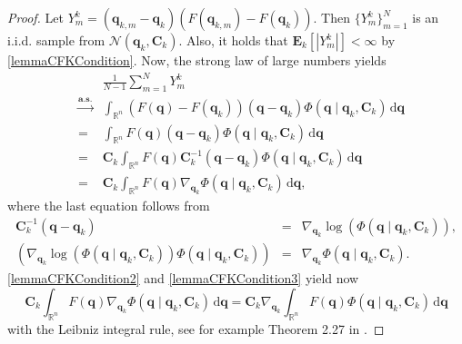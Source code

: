 \begin{proof}
Let $Y^k_m=(\mathbf{q}_{k,m}-\mathbf{q}_k)(F(\mathbf{q}_{k,m})-F(\mathbf{q}_k))$. Then $\{Y^k_m\}_{m=1}^N$ is an i.i.d. sample from $\mathcal{N}(\mathbf{q}_k, \mathbf{C}_k)$. Also, it holds that $\mathbf{E}_k[|Y^k_m|]<\infty$ by \eqref{lemmaCFKCondition}. Now, the strong law of large numbers yields
\begin{eqnarray*}
&&\frac{1}{N-1}\sum_{m=1}^NY^k_m\\
&\xrightarrow{\mathbf{a.s.}}&\int_{\mathbb{R}^n}(F(\mathbf{q})-F(\mathbf{q}_k))(\mathbf{q}-\mathbf{q}_k)\Phi(\mathbf{q}\mid \mathbf{q}_k, \mathbf{C}_k)\,\mathrm{d}\mathbf{q}\\
&=&\int_{\mathbb{R}^n}F(\mathbf{q})(\mathbf{q}-\mathbf{q}_k)\Phi(\mathbf{q}\mid \mathbf{q}_k, \mathbf{C}_k)\,\mathrm{d}\mathbf{q}\\
&=&\mathbf{C}_k\int_{\mathbb{R}^n}F(\mathbf{q})\mathbf{C}^{-1}_k(\mathbf{q}-\mathbf{q}_k)\Phi(\mathbf{q}\mid \mathbf{q}_k, \mathbf{C}_k)\,\mathrm{d}\mathbf{q}\\
&=&\mathbf{C}_k\int_{\mathbb{R}^n}F(\mathbf{q})\nabla_{\mathbf{q}_k}\Phi(\mathbf{q}\mid \mathbf{q}_k, \mathbf{C}_k)\,\mathrm{d}\mathbf{q},
\end{eqnarray*}
where the last equation follows from
\begin{eqnarray*}
\mathbf{C}^{-1}_k(\mathbf{q}-\mathbf{q}_k)&=&\nabla_{\mathbf{q}_k}\log(\Phi(\mathbf{q}\mid \mathbf{q}_k, \mathbf{C}_k)),\\
\left(\nabla_{\mathbf{q}_k}\log(\Phi(\mathbf{q}\mid \mathbf{q}_k, \mathbf{C}_k))\Phi(\mathbf{q}\mid \mathbf{q}_k, \mathbf{C}_k)\right)&=&\nabla_{\mathbf{q}_k}\Phi(\mathbf{q}\mid \mathbf{q}_k, \mathbf{C}_k).
\end{eqnarray*}
\eqref{lemmaCFKCondition2} and \eqref{lemmaCFKCondition3} yield now
\begin{equation*}
\mathbf{C}_k\int_{\mathbb{R}^n}F(\mathbf{q})\nabla_{\mathbf{q}_k}\Phi(\mathbf{q}\mid \mathbf{q}_k, \mathbf{C}_k)\,\mathrm{d}\mathbf{q}=\mathbf{C}_k\nabla_{\mathbf{q}_k}\int_{\mathbb{R}^n}F(\mathbf{q})\Phi(\mathbf{q}\mid \mathbf{q}_k, \mathbf{C}_k)\,\mathrm{d}\mathbf{q}
\end{equation*}
with the Leibniz integral rule, see for example Theorem 2.27 in \cite{Folland_undated-pd}.
\end{proof}



